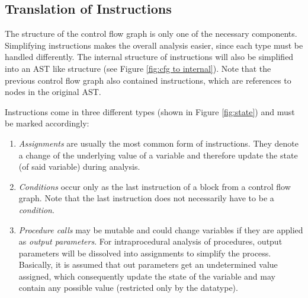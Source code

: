 \clearpage
\pagebreak
\subsection{Translation of Instructions}
\label{subsec:translate instructions}
The structure of the control flow graph is only one of the necessary components. 
Simplifying instructions makes the overall analysis easier, since each type must be handled differently.
The internal structure of instructions will also be simplified into an AST like structure (see Figure \ref{fig:cfg to internal}). 
Note that the previous control flow graph also contained instructions, which are references to nodes in the original AST. 


Instructions come in three different types (shown in Figure \ref{fig:state}) and must be marked accordingly:
\begin{enumerate}
	\item \emph{Assignments} are usually the most common form of instructions. They denote a change of the underlying value of a variable and therefore update the state (of said variable) during analysis. 
	\item \emph{Conditions} occur only as the last instruction of a block from a control flow graph. Note that the last instruction does not necessarily have to be a \emph{condition}.
	\item \emph{Procedure calls} may be mutable and could change variables if they are applied as \emph{output parameters}. %
	For intraprocedural analysis of procedures, output parameters will be dissolved into assignments to simplify the process. Basically, it is assumed that out parameters get an undetermined value assigned, which consequently update the state of the variable and may contain any possible value (restricted only by the datatype).
\end{enumerate}

